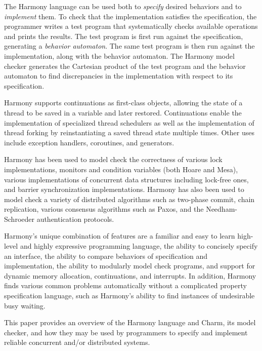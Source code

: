 \documentclass[twocolumn]{article}
\begin{document}
The Harmony language can be used both to \emph{specify} desired
behaviors and to \emph{implement} them.  To check that the implementation
satisfies the specification, the programmer writes a test program that
systematically checks available operations and prints the results.
The test program is first run against the specification, generating
a \emph{behavior automaton}.  The same test program is then run
against the implementation, along with the behavior automaton.
The Harmony model checker generates the Cartesian product of the test program
and the behavior automaton to find discrepancies in the implementation
with respect to its specification.

Harmony supports continuations as first-class objects, allowing the
state of a thread to be saved in a variable and later restored.
Continuations enable the implementation of specialized thread
schedulers as well as the implementation of thread forking by
reinstantiating a saved thread state multiple times.
Other uses include exception handlers, coroutines, and generators.

Harmony has been used to model check the correctness of various lock
implementations, monitors and condition variables (both Hoare and Mesa),
various implementations of concurrent data structures including lock-free
ones, and barrier synchronization implementations.  Harmony has also been
used to model check a variety of distributed algorithms such as two-phase
commit, chain replication, various consensus algorithms such as Paxos,
and the Needham-Schroeder authentication protocols.

Harmony's unique combination of features are a familiar and easy
to learn high-level and highly expressive programming language, the
ability to concisely specify an interface, the ability to compare
behaviors of specification and implementation, the ability to
modularly model check programs, and support for dynamic memory
allocation, continuations, and interrupts.  In addition, Harmony
finds various common problems automatically without a complicated
property specification language, such as Harmony's ability to find
instances of undesirable busy waiting.

This paper provides an overview of the Harmony language and Charm,
its model checker, and how they may be used by programmers to
specify and implement reliable concurrent and/or distributed systems.
\end{document}
